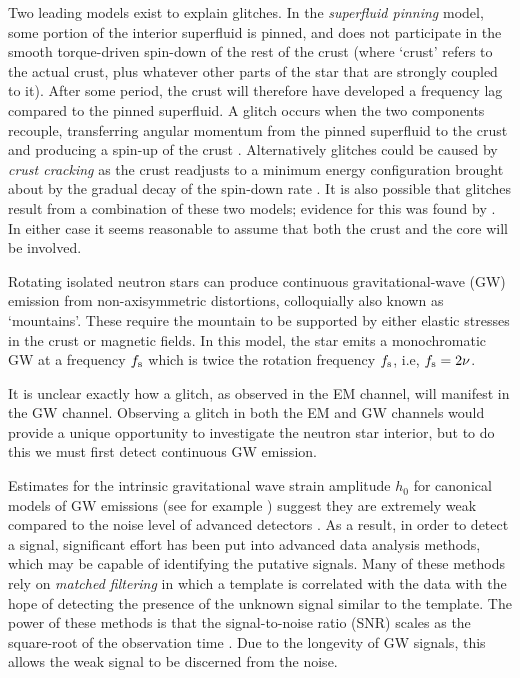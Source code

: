 \documentclass[../full_thesis/full_thesis.tex]{subfiles}
\begin{document}
Two leading models exist to explain glitches. In the \emph{superfluid pinning}
model, some portion of the interior superfluid is pinned, and does not
participate in the smooth torque-driven spin-down of the rest of the
crust (where `crust' refers to the actual crust, plus whatever other parts of
the star that are strongly coupled to it).  After some period, the crust will
therefore have developed a frequency lag compared to the pinned superfluid. A
glitch occurs when the two components recouple, transferring
angular momentum from the pinned superfluid to the crust and producing a
spin-up of the crust \citep{Anderson1975, Alpar1984}.  Alternatively glitches
could be caused by \emph{crust cracking} as the crust readjusts to a minimum
energy configuration brought about by the gradual decay of the spin-down rate
\citep{Baym1971}.  It is also possible that glitches result from a combination
of these two models; evidence for this was found by \citet{Melatos2008}.  In
either case it seems reasonable to assume that both the crust and the core will
be involved.

Rotating isolated neutron stars can produce continuous gravitational-wave (GW)
emission from non-axisymmetric distortions, colloquially also known as `mountains'. These
require the mountain to be supported by either elastic stresses in the crust or
magnetic fields. In this model, the star emits a monochromatic GW at a
frequency $f_{\textrm{s}}$ which is twice the rotation frequency $f_{\textrm{s}}$, i.e, $f_{\textrm{s}}=2\nu$.

It is unclear exactly how a glitch, as observed in the EM channel, will
manifest in the GW channel.  Observing a glitch in both the EM and GW channels
would provide a unique opportunity to investigate the neutron star interior, but to do
this we must first detect continuous GW emission.

Estimates for the intrinsic gravitational wave strain amplitude
$h_0$ for canonical models of GW emissions (see for example \citet{abbott2008beating})
suggest they are extremely weak compared to the noise level of advanced
detectors \citep{aasi2015narrow}.  As a result, in order to detect a signal,
significant effort has been put into advanced data analysis methods,
which may be capable of identifying the putative signals. Many of these methods
rely on \emph{matched filtering} in which a template is correlated with the data
with the hope of detecting the presence of the unknown signal similar to the
template. The power of these methods is that
the signal-to-noise ratio (SNR) scales as the square-root of the observation
time \citep{Prix2009}. Due to the longevity of GW signals, this allows the weak
signal to be discerned from the noise.
\end{document}
